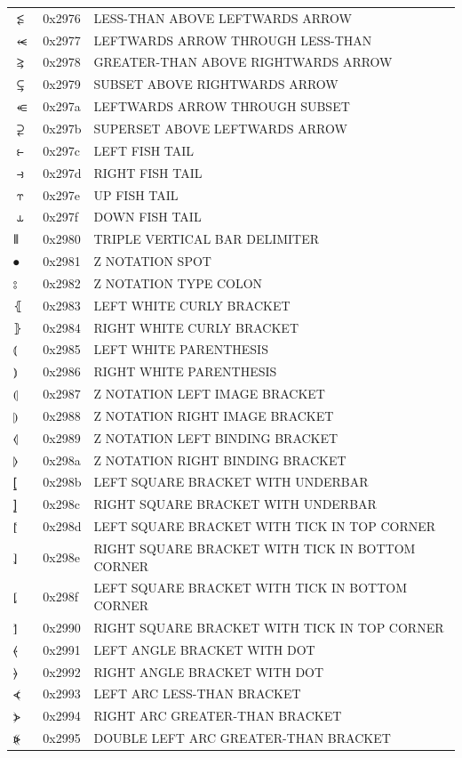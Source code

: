 \documentclass[12pt, twoside]{article}
\begin{document}
\begin{longtable}{L{1.0cm} L{2.0cm} >{\footnotesize}L{10cm}}
$⥶$&0x2976&LESS-THAN ABOVE LEFTWARDS ARROW\\
$⥷$&0x2977&LEFTWARDS ARROW THROUGH LESS-THAN\\
$⥸$&0x2978&GREATER-THAN ABOVE RIGHTWARDS ARROW\\
$⥹$&0x2979&SUBSET ABOVE RIGHTWARDS ARROW\\
$⥺$&0x297a&LEFTWARDS ARROW THROUGH SUBSET\\
$⥻$&0x297b&SUPERSET ABOVE LEFTWARDS ARROW\\
$⥼$&0x297c&LEFT FISH TAIL\\
$⥽$&0x297d&RIGHT FISH TAIL\\
$⥾$&0x297e&UP FISH TAIL\\
$⥿$&0x297f&DOWN FISH TAIL\\
$⦀$&0x2980&TRIPLE VERTICAL BAR DELIMITER\\
$⦁$&0x2981&Z NOTATION SPOT\\
$⦂$&0x2982&Z NOTATION TYPE COLON\\
$⦃$&0x2983&LEFT WHITE CURLY BRACKET\\
$⦄$&0x2984&RIGHT WHITE CURLY BRACKET\\
$⦅$&0x2985&LEFT WHITE PARENTHESIS\\
$⦆$&0x2986&RIGHT WHITE PARENTHESIS\\
$⦇$&0x2987&Z NOTATION LEFT IMAGE BRACKET\\
$⦈$&0x2988&Z NOTATION RIGHT IMAGE BRACKET\\
$⦉$&0x2989&Z NOTATION LEFT BINDING BRACKET\\
$⦊$&0x298a&Z NOTATION RIGHT BINDING BRACKET\\
$⦋$&0x298b&LEFT SQUARE BRACKET WITH UNDERBAR\\
$⦌$&0x298c&RIGHT SQUARE BRACKET WITH UNDERBAR\\
$⦍$&0x298d&LEFT SQUARE BRACKET WITH TICK IN TOP CORNER\\
$⦎$&0x298e&RIGHT SQUARE BRACKET WITH TICK IN BOTTOM CORNER\\
$⦏$&0x298f&LEFT SQUARE BRACKET WITH TICK IN BOTTOM CORNER\\
$⦐$&0x2990&RIGHT SQUARE BRACKET WITH TICK IN TOP CORNER\\
$⦑$&0x2991&LEFT ANGLE BRACKET WITH DOT\\
$⦒$&0x2992&RIGHT ANGLE BRACKET WITH DOT\\
$⦓$&0x2993&LEFT ARC LESS-THAN BRACKET\\
$⦔$&0x2994&RIGHT ARC GREATER-THAN BRACKET\\
$⦕$&0x2995&DOUBLE LEFT ARC GREATER-THAN BRACKET\\

\end{longtable}
\end{document}

